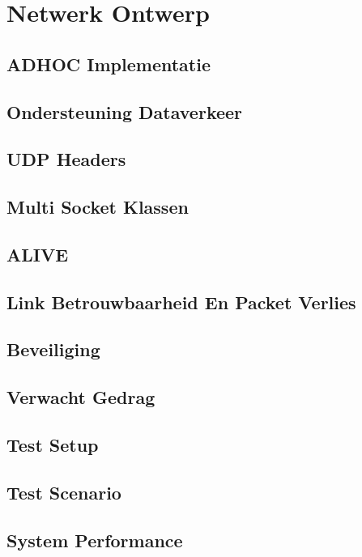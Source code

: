 \documentclass[12pt]{article}
\begin{document}
\section{Netwerk Ontwerp}


\subsection{ADHOC Implementatie}


\subsection{Ondersteuning Dataverkeer}


\subsection{UDP Headers}


\subsection{Multi Socket Klassen}


\subsection{ALIVE}


\subsection{Link Betrouwbaarheid En Packet Verlies}


\subsection{Beveiliging}


\subsection{Verwacht Gedrag}


\subsection{Test Setup}


\subsection{Test Scenario}


\subsection{System Performance}
\end{document}
